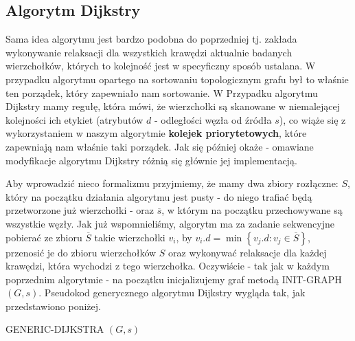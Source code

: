 \subsection{Algorytm Dijkstry}
\label{sub:dijkstraAlgorithm}

Sama idea algorytmu jest bardzo podobna do poprzedniej tj. zakłada wykonywanie relaksacji dla wszystkich krawędzi aktualnie badanych wierzchołków, których to kolejność jest w specyficzny sposób ustalana. W przypadku algorytmu opartego na sortowaniu topologicznym grafu był to właśnie ten porządek, który zapewniało nam sortowanie. W Przypadku algorytmu Dijkstry mamy regułę, która mówi, że wierzchołki są skanowane w niemalejącej kolejności ich etykiet (atrybutów $d$ - odległości węzła od źródła $s$), co wiąże się z wykorzystaniem w naszym algorytmie \textbf{kolejek priorytetowych}, które zapewniają nam właśnie taki porządek. Jak się później okaże - omawiane modyfikacje algorytmu Dijkstry różnią się głównie jej implementacją.

Aby wprowadzić nieco formalizmu przyjmiemy, że mamy dwa zbiory rozłączne: $S$, który na początku działania algorytmu jest pusty - do niego trafiać będą przetworzone już wierzchołki - oraz $\overline{s}$, w którym na początku przechowywane są wszystkie węzły. Jak już wspomnieliśmy, algorytm ma za zadanie sekwencyjne pobierać ze zbioru $\overline{S}$ takie wierzchołki $v_{i}$, by $v_{i}.d = \min \left\{ v_{j}.d : v_{j} \in \overline{S} \right\}$, przenosić je do zbioru wierzchołków $S$ oraz wykonywać relaksacje dla każdej krawędzi, która wychodzi z tego wierzchołka. Oczywiście - tak jak w każdym poprzednim algorytmie - na początku inicjalizujemy graf metodą \textsc{INIT-GRAPH} $\left( G, s \right)$. Pseudokod generycznego algorytmu Dijkstry wygląda tak, jak przedstawiono poniżej.

\begin{algorithm}[!htbp]
\DontPrintSemicolon
{}
\caption{ GENERIC-DIJKSTRA $\left( G, s \right)$\label{alg:GenericDijksta}}
\end{algorithm}

